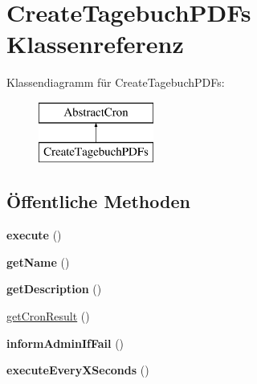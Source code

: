 \hypertarget{class_create_tagebuch_p_d_fs}{}\section{Create\+Tagebuch\+P\+D\+Fs Klassenreferenz}
\label{class_create_tagebuch_p_d_fs}
Klassendiagramm für Create\+Tagebuch\+P\+D\+Fs\+:\begin{figure}[H]
\begin{center}
\leavevmode
\includegraphics[height=2.000000cm]{class_create_tagebuch_p_d_fs}
\end{center}
\end{figure}
\subsection*{Öffentliche Methoden}
\begin{DoxyCompactItemize}
\item 
\mbox{\label{class_create_tagebuch_p_d_fs_aaccf74ac311fd453a0d7d29c6fc9e87d}} 
{\bfseries execute} ()
\item 
\mbox{\label{class_create_tagebuch_p_d_fs_abf1b2a18f4a600714dcc78489818a59f}} 
{\bfseries get\+Name} ()
\item 
\mbox{\label{class_create_tagebuch_p_d_fs_a469dd7283b57fa868e30df6e74738fc1}} 
{\bfseries get\+Description} ()
\item 
\mbox{\hyperlink{class_create_tagebuch_p_d_fs_a90a43d1426e7be211b76be8108641067}{get\+Cron\+Result}} ()
\item 
\mbox{\label{class_create_tagebuch_p_d_fs_a8f7f578535881d3836793e6b3c0adbf2}} 
{\bfseries inform\+Admin\+If\+Fail} ()
\item 
\mbox{\label{class_create_tagebuch_p_d_fs_a976d72110f01e95c4ba3eecfed95a5d5}} 
{\bfseries execute\+Every\+X\+Seconds} ()
\end{DoxyCompactItemize}



